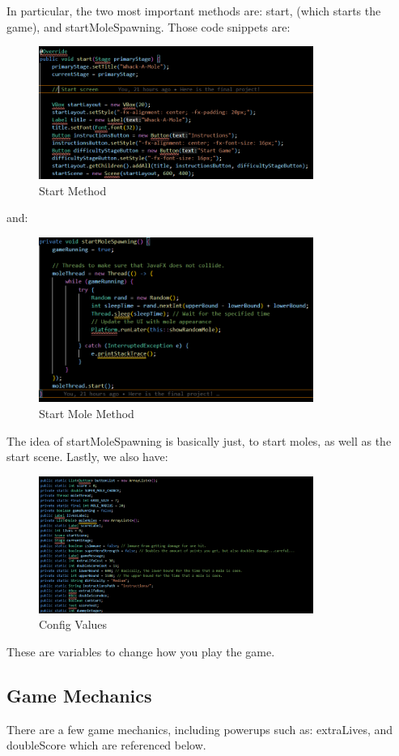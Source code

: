 \documentclass[mdthm]{scrartcl}
\begin{document}
\pagebreak

In particular, the two most important methods are: start, (which starts the game), and startMoleSpawning. Those code snippets are: 

\begin{figure}[h]
    \centering
    \includegraphics[width=0.8\textwidth]{../images/start.png}
    \caption{Start Method}
    \label{fig:myimage}
\end{figure}

and: 

\begin{figure}[h]
    \centering
    \includegraphics[width=0.8\textwidth]{../images/startMoleSpawning.png}
    \caption{Start Mole Method}
    \label{fig:myimage}
\end{figure}


The idea of startMoleSpawning is basically just, to start moles, as well as the start scene. Lastly, we also have: 

\begin{figure}[b]
    \centering
    \includegraphics[width=0.8\textwidth]{../images/config.png}
    \caption{Config Values}
    \label{fig:myimage}
\end{figure}

These are variables to change how you play the game.

\subsection{Game Mechanics}

There are a few game mechanics, including powerups such as: extraLives, and doubleScore which are referenced below. 
\end{document}
